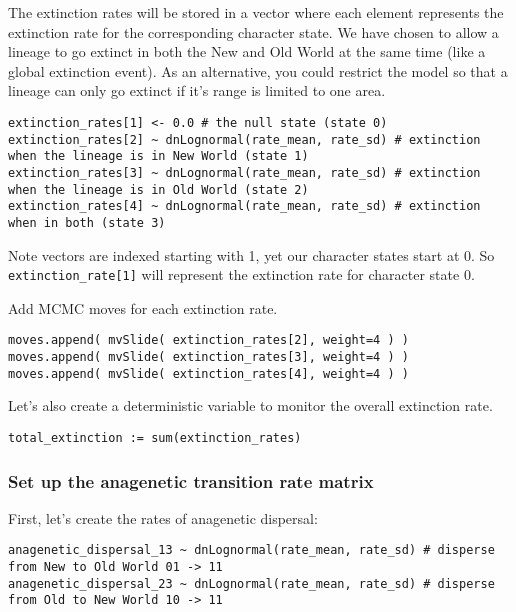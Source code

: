 The extinction rates will be stored in a vector where each element represents
the extinction rate for the corresponding character state. 
We have chosen to allow a lineage to go extinct in both the New and Old World 
at the same time (like a global extinction event). As an alternative, you could 
restrict the model so that a lineage can only go extinct if it's range is limited 
to one area.
{\tt \begin{snugshade*}
\begin{lstlisting}
extinction_rates[1] <- 0.0 # the null state (state 0)
extinction_rates[2] ~ dnLognormal(rate_mean, rate_sd) # extinction when the lineage is in New World (state 1)
extinction_rates[3] ~ dnLognormal(rate_mean, rate_sd) # extinction when the lineage is in Old World (state 2)
extinction_rates[4] ~ dnLognormal(rate_mean, rate_sd) # extinction when in both (state 3)
\end{lstlisting}
\end{snugshade*}}
Note \Rev vectors are indexed starting with 1, yet our character states start
at 0. So \texttt{extinction\_rate[1]} will represent the extinction rate for character
state 0.

Add MCMC moves for each extinction rate.
{\tt \begin{snugshade*}
\begin{lstlisting}
moves.append( mvSlide( extinction_rates[2], weight=4 ) )
moves.append( mvSlide( extinction_rates[3], weight=4 ) )
moves.append( mvSlide( extinction_rates[4], weight=4 ) )
\end{lstlisting}
\end{snugshade*}}

Let's also create a deterministic variable to monitor the overall extinction rate.
{\tt \begin{snugshade*}
\begin{lstlisting}
total_extinction := sum(extinction_rates)
\end{lstlisting}
\end{snugshade*}}

\subsubsection{Set up the anagenetic transition rate matrix}

First, let's create the rates of anagenetic dispersal:
{\tt \begin{snugshade*}
\begin{lstlisting}
anagenetic_dispersal_13 ~ dnLognormal(rate_mean, rate_sd) # disperse from New to Old World 01 -> 11
anagenetic_dispersal_23 ~ dnLognormal(rate_mean, rate_sd) # disperse from Old to New World 10 -> 11
\end{lstlisting}
\end{snugshade*}}

